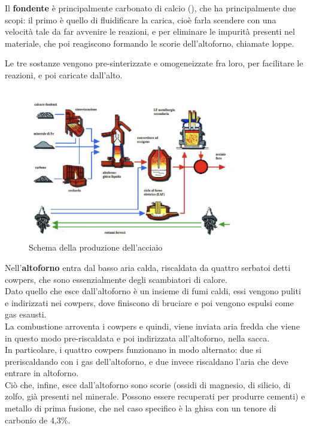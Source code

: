 Il \textbf{fondente} è principalmente carbonato di calcio (), che ha principalmente due scopi: il primo è quello di fluidificare la carica, cioè farla scendere con una velocità tale da far avvenire le reazioni, e per eliminare le impurità presenti nel materiale, che poi reagiscono formando le scorie dell’altoforno, chiamate loppe.

Le tre sostanze vengono pre-sinterizzate e omogeneizzate fra loro, per facilitare le reazioni, e poi caricate dall’alto.

\begin{figure}[!hbt]
    \includegraphics[width=0.8\textwidth]{images/img26.png}
    \caption{Schema della produzione dell'acciaio}
\end{figure}

Nell’\textbf{altoforno} entra dal basso aria calda, riscaldata da quattro serbatoi detti cowpers, che sono essenzialmente degli scambiatori di calore.\\
Dato quello che esce dall’altoforno è un insieme di fumi caldi, essi vengono puliti e indirizzati nei cowpers, dove finiscono di bruciare e poi vengono espulsi come gas esausti.\\
La combustione arroventa i cowpers e quindi, viene inviata aria fredda che viene in questo modo pre-riscaldata e poi indirizzata all’altoforno, nella sacca.\\
In particolare, i quattro cowpers funzionano in modo alternato: due si preriscaldando con i gas dell’altoforno, e due invece riscaldano l’aria che deve entrare in altoforno.\\
Ciò che, infine, esce dall'altoforno sono scorie (ossidi di magnesio, di silicio, di zolfo, già presenti nel minerale. Possono essere recuperati per produrre cementi) e metallo di prima fusione, che nel caso specifico è la ghisa con un tenore di carbonio de 4,3\%.

